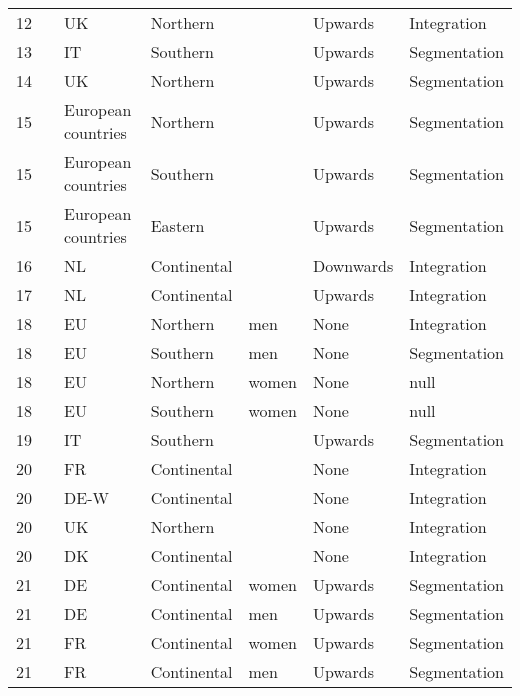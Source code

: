 \begin{longtable}{l>{\raggedright\arraybackslash}p{1.2in}>{\raggedright\arraybackslash}p{.9in}>{\raggedright\arraybackslash}p{.9in}>{\raggedright\arraybackslash}p{1.2in}ll}
   12 & \citealp{booth_etal_2002} & UK & Northern &  & Upwards & Integration \\ 
   13 & \citealp{bosco_valeriani_2018} & IT & Southern &  & Upwards & Segmentation \\ 
   14 & \citealp{brown_sessions_2003} & UK & Northern &  & Upwards & Segmentation \\ 
   15 & \citealp{comi_grasseni_2012} & 9 European countries & Northern &  & Upwards & Segmentation \\ 
   15 & \citealp{comi_grasseni_2012} & 9 European countries & Southern &  & Upwards & Segmentation \\ 
   15 & \citealp{comi_grasseni_2012} & 9 European countries & Eastern &  & Upwards & Segmentation \\ 
   16 & \citealp{de_graaf_zijl_etal_2011} & NL & Continental &  & Downwards & Integration \\ 
   17 & \citealp{de_lange_etal_2014} & NL & Continental &  & Upwards & Integration \\ 
   18 & \citealp{debels_2008} & EU & Northern & men & None & Integration \\ 
   18 & \citealp{debels_2008} & EU & Southern & men & None & Segmentation \\ 
   18 & \citealp{debels_2008} & EU & Northern & women & None & null \\ 
   18 & \citealp{debels_2008} & EU & Southern & women & None & null \\ 
   19 & \citealp{gagliarducci_2005} & IT & Southern &  & Upwards & Segmentation \\ 
   20 & \citealp{gash_2008} & FR & Continental &  & None & Integration \\ 
   20 & \citealp{gash_2008} & DE-W & Continental &  & None & Integration \\ 
   20 & \citealp{gash_2008} & UK & Northern &  & None & Integration \\ 
   20 & \citealp{gash_2008} & DK & Continental &  & None & Integration \\ 
   21 & \citealp{gash_mcginnity_2007} & DE & Continental & women & Upwards & Segmentation \\ 
   21 & \citealp{gash_mcginnity_2007} & DE & Continental & men & Upwards & Segmentation \\ 
   21 & \citealp{gash_mcginnity_2007} & FR & Continental & women & Upwards & Segmentation \\ 
   21 & \citealp{gash_mcginnity_2007} & FR & Continental & men & Upwards & Segmentation \\ 

\end{longtable}
